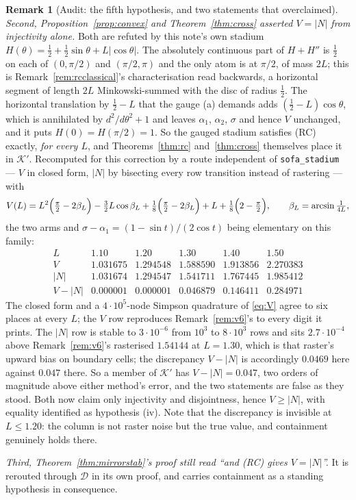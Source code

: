 \documentclass[11pt]{article}
\theoremstyle{definition}
\newtheorem{remark}[theorem]{Remark}
\begin{document}
\begin{remark}[Audit: the fifth hypothesis, and two statements that overclaimed]
\emph{Second, Proposition~\ref{prop:convex} and Theorem~\ref{thm:cross} asserted $V=|N|$ from
injectivity alone.} Both are refuted by this note's own stadium
$H(\theta)=\tfrac12+\tfrac12\sin\theta+L|\cos\theta|$. The absolutely continuous part of
$H+H''$ is $\tfrac12$ on each of $(0,\pi/2)$ and $(\pi/2,\pi)$ and the only atom is at
$\pi/2$, of mass $2L$; this is Remark~\ref{rem:rcclassical}'s characterisation read
backwards, a horizontal segment of length $2L$ Minkowski-summed with the disc of radius
$\tfrac12$. The horizontal translation by $\tfrac12-L$ that the gauge (a) demands adds
$(\tfrac12-L)\cos\theta$, which is annihilated by $d^2/d\theta^2+1$ and leaves $\alpha_1$,
$\alpha_2$, $\sigma$ and hence $V$ unchanged, and it puts $H(0)=H(\pi/2)=1$. So the gauged
stadium satisfies (RC) exactly, \emph{for every $L$}, and Theorems~\ref{thm:rc}
and~\ref{thm:cross} themselves place it in $\mathcal K'$. Recomputed for this correction by a
route independent of \verb|sofa_stadium| --- $V$ in closed form, $|N|$ by bisecting every row
transition instead of rastering --- with
\[
  V(L)=L^2\Bigl(\tfrac\pi2-2\beta_L\Bigr)-\tfrac32L\cos\beta_L
       +\tfrac18\Bigl(\tfrac\pi2-2\beta_L\Bigr)+L+\tfrac18\Bigl(2-\tfrac\pi2\Bigr),
  \qquad \beta_L=\arcsin\tfrac1{4L},
\]
the two arms and $\sigma-\alpha_1=(1-\sin t)/(2\cos t)$ being elementary on this family:
\[
  \begin{array}{r|ccccc}
    L & 1.10 & 1.20 & 1.30 & 1.40 & 1.50\\\hline
    V & 1.031675 & 1.294548 & 1.588590 & 1.913856 & 2.270383\\
    |N| & 1.031674 & 1.294547 & 1.541711 & 1.767445 & 1.985412\\
    V-|N| & 0.000001 & 0.000001 & 0.046879 & 0.146411 & 0.284971
  \end{array}
\]
The closed form and a $4\cdot10^5$-node Simpson quadrature of \eqref{eq:V} agree to six
places at every $L$; the $V$ row reproduces Remark~\ref{rem:v6}'s to every digit it prints.
The $|N|$ row is stable to $3\cdot10^{-6}$ from $10^3$ to $8\cdot10^3$ rows and sits
$2.7\cdot10^{-4}$ above Remark~\ref{rem:v6}'s rasterised $1.54144$ at $L=1.30$, which is that
raster's upward bias on boundary cells; the discrepancy $V-|N|$ is accordingly $0.0469$ here
against $0.047$ there. So a member of $\mathcal K'$ has $V-|N|=0.047$, two orders of
magnitude above either method's error, and the two statements are false as they stood. Both now claim only injectivity and disjointness, hence $V\ge|N|$, with equality
identified as hypothesis (iv). Note that the discrepancy is invisible at $L\le1.20$: the
column is not raster noise but the true value, and containment genuinely holds there.

\emph{Third, Theorem~\ref{thm:mirrorstab}'s proof still read ``and (RC) gives $V=|N|$''.} It
is rerouted through $\mathcal D$ in its own proof, and carries containment as a standing
hypothesis in consequence.
\end{remark}
\end{document}
